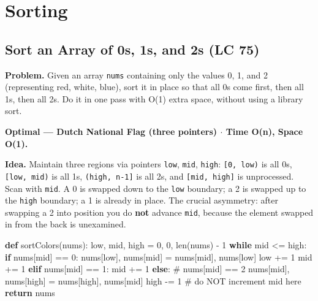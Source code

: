 \documentclass[11pt]{article}
\newenvironment{Shaded}{\begin{snugshade}}{\end{snugshade}}
\newcommand{\BuiltInTok}[1]{\textcolor[rgb]{0.50,0.55,0.55}{#1}}
\newcommand{\CommentTok}[1]{\textcolor[rgb]{0.48,0.49,0.49}{#1}}
\newcommand{\ControlFlowTok}[1]{\textcolor[rgb]{0.99,0.74,0.29}{\textbf{#1}}}
\newcommand{\DecValTok}[1]{\textcolor[rgb]{0.96,0.45,0.00}{#1}}
\newcommand{\KeywordTok}[1]{\textcolor[rgb]{0.81,0.81,0.76}{\textbf{#1}}}
\newcommand{\NormalTok}[1]{\textcolor[rgb]{0.81,0.81,0.76}{#1}}
\newcommand{\OperatorTok}[1]{\textcolor[rgb]{0.81,0.81,0.76}{#1}}
\begin{document}
\section{Sorting}\label{sorting}

\subsection{Sort an Array of 0s, 1s, and 2s (LC 75)}\label{sort-an-array-of-0s-1s-and-2s-lc-75}

\textbf{Problem.} Given an array \texttt{nums} containing only the values 0, 1, and 2 (representing red, white, blue), sort it in place so that all 0s come first, then all 1s, then all 2s. Do it in one pass with O(1) extra space, without using a library sort.

\textbf{Optimal --- Dutch National Flag (three pointers) \(\cdot\) Time O(n), Space O(1).}

\textbf{Idea.} Maintain three regions via pointers \texttt{low}, \texttt{mid}, \texttt{high}: \texttt{{[}0,\ low)} is all 0s, \texttt{{[}low,\ mid)} is all 1s, \texttt{(high,\ n-1{]}} is all 2s, and \texttt{{[}mid,\ high{]}} is unprocessed. Scan with \texttt{mid}. A 0 is swapped down to the \texttt{low} boundary; a 2 is swapped up to the \texttt{high} boundary; a 1 is already in place. The crucial asymmetry: after swapping a 2 into position you do \textbf{not} advance \texttt{mid}, because the element swapped in from the back is unexamined.


\begin{Shaded}
\begin{Highlighting}[]
\KeywordTok{def}\NormalTok{ sortColors(nums):}
\NormalTok{    low, mid, high }\OperatorTok{=} \DecValTok{0}\NormalTok{, }\DecValTok{0}\NormalTok{, }\BuiltInTok{len}\NormalTok{(nums) }\OperatorTok{{-}} \DecValTok{1}
    \ControlFlowTok{while}\NormalTok{ mid }\OperatorTok{\textless{}=}\NormalTok{ high:}
        \ControlFlowTok{if}\NormalTok{ nums[mid] }\OperatorTok{==} \DecValTok{0}\NormalTok{:}
\NormalTok{            nums[low], nums[mid] }\OperatorTok{=}\NormalTok{ nums[mid], nums[low]}
\NormalTok{            low }\OperatorTok{+=} \DecValTok{1}
\NormalTok{            mid }\OperatorTok{+=} \DecValTok{1}
        \ControlFlowTok{elif}\NormalTok{ nums[mid] }\OperatorTok{==} \DecValTok{1}\NormalTok{:}
\NormalTok{            mid }\OperatorTok{+=} \DecValTok{1}
        \ControlFlowTok{else}\NormalTok{:  }\CommentTok{\# nums[mid] == 2}
\NormalTok{            nums[mid], nums[high] }\OperatorTok{=}\NormalTok{ nums[high], nums[mid]}
\NormalTok{            high }\OperatorTok{{-}=} \DecValTok{1}
            \CommentTok{\# do NOT increment mid here}
    \ControlFlowTok{return}\NormalTok{ nums}
\end{Highlighting}
\end{Shaded}
\end{document}
